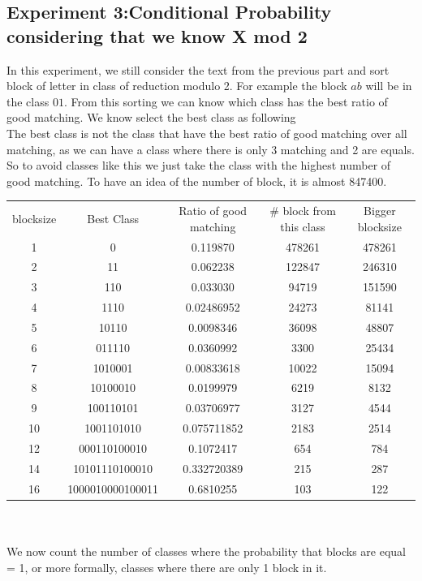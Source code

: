 \documentclass{article}
\begin{document}
\subsection*{Experiment 3:Conditional Probability considering that we know X mod 2}
In this experiment, we still consider the text from the previous part and sort block of letter in class of reduction modulo 2.
For example the block $ab$ will be in the class $01$. From this sorting we can know which class has the best ratio of good matching.
We know select the best class as following\\
The best class is not the class that have the best ratio of good matching over all matching, as we can have a class where there is only 3 matching and 2 are equals. So to avoid classes like this we just take the class with the highest number of good matching.
To have an idea of the number of block, it is almost 847400.\\
\begin{tabular}{|c|c|c|c|c|}
  \hline
  blocksize & Best Class & Ratio of good matching & \# block from this class & Bigger blocksize\\
	1 & 0 & 0.119870 & 478261 & 478261\\
	2 & 11 & 0.062238 & 122847 & 246310\\
	3 & 110 & 0.033030 & 94719 & 151590\\
	4 & 1110 & 0.02486952 & 24273 & 81141\\
	5 & 10110 & 0.0098346 & 36098 & 48807\\
	6 & 011110 & 0.0360992 & 3300 & 25434\\
	7 & 1010001 & 0.00833618 & 10022 & 15094\\
	8 & 10100010 & 0.0199979 & 6219 & 8132\\
	9 & 100110101 & 0.03706977 & 3127 & 4544\\
	10 & 1001101010 & 0.075711852 & 2183 & 2514\\
	12 & 000110100010 & 0.1072417 & 654 & 784\\
	14 & 10101110100010 & 0.332720389 & 215 & 287\\
	16 & 1000010000100011 & 0.6810255 & 103 & 122\\
	\hline
\end{tabular}\\
\\
We now count the number of classes where the probability that blocks are equal = 1, or more formally, classes where there are only 1 block in it.\\
\end{document}

